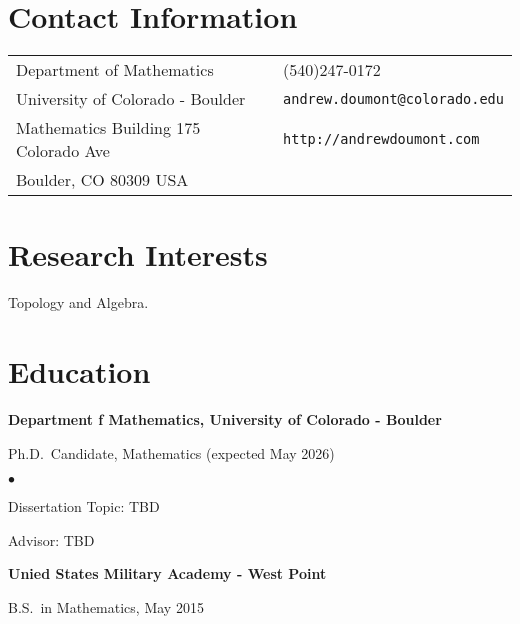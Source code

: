 \documentclass[margin,line,pifont,palatino,courier]{res}
\newenvironment{list1}{
  \begin{list}{\ding{113}}{%
      \setlength{\itemsep}{0in}
      \setlength{\parsep}{0in} \setlength{\parskip}{0in}
      \setlength{\topsep}{0in} \setlength{\partopsep}{0in}
      \setlength{\leftmargin}{0.17in}}}{\end{list}}
\newenvironment{list2}{
  \begin{list}{$\bullet$}{%
      \setlength{\itemsep}{0in}
      \setlength{\parsep}{0in} \setlength{\parskip}{0in}
      \setlength{\topsep}{0in} \setlength{\partopsep}{0in}
      \setlength{\leftmargin}{0.2in}}}{\end{list}}
\begin{document}

\begin{resume}

\section{\sc Contact Information}

\vspace{.05in}
\begin{tabular}{@{}p{2.75in}p{2in}}
Department of Mathematics  & (540)247-0172 \\
University of Colorado - Boulder                        & \verb+andrew.doumont@colorado.edu+\\
Mathematics Building 175 Colorado Ave                 & \verb+http://andrewdoumont.com+\\
Boulder, CO 80309 USA              & \\
\end{tabular}

\section{\sc Research Interests}
Topology and Algebra.

\section{\sc Education}

{\bf Department f Mathematics, University of Colorado - Boulder}\\
\vspace*{-.1in}
\begin{list1}
\item[] Ph.D.~Candidate, Mathematics (expected May 2026)

\begin{list2}
\vspace*{.05in}
\item Dissertation Topic:  TBD
\item Advisor: TBD
\end{list2}
\end{list1}

{\bf Unied States Military Academy - West Point}\\
\vspace*{-.1in}
\begin{list1}
\item[] B.S.~in Mathematics, May 2015


\end{list1}
\end{resume}
\end{document}
